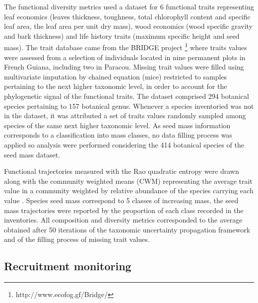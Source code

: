 \documentclass[fleqn,10pt]{ArtEcoFoG} %
\begin{document}
The functional diversity metrics used a dataset for 6 functional traits
representing leaf economics (leaves thickness, toughness, total
chlorophyll content and specific leaf area, the leaf area per unit dry
mass), wood economics (wood specific gravity and bark thickness) and
life history traits (maximum specific height and seed mass). The trait
database came from the BRIDGE project \footnote{http://www.ecofog.gf/Bridge/}
where traits values were assessed from a selection of individuals
located in nine permanent plots in French Guiana, including two in
Paracou. Missing trait values were filled using multivariate imputation
by chained equation (mice) restricted to samples pertaining to the next
higher taxonomic level, in order to account for the phylogenetic signal
of the functional traits. The dataset comprised 294 botanical species
pertaining to 157 botanical genus. Whenever a species inventoried was
not in the dataset, it was attributed a set of traits values randomly
sampled among species of the same next higher taxonomic level. As seed
mass information corresponds to a classification into mass classes, no
data filling process was applied so analysis were performed considering
the 414 botanical species of the seed mass dataset.

Functional trajectories measured with the Rao quadratic entropy were
drawn along with the community weighted means (CWM) representing the
average trait value in a community weighted by relative abundance of the
species carrying each value \citep{Diaz2007, Garnier2004}. Species seed
mass correspond to 5 classes of increasing mass, the seed mass
trajectories were reported by the proportion of each class recorded in
the inventories. All composition and diversity metrics corresponded to
the average obtained after 50 iterations of the taxonomic uncertainty
propagation framework and of the filling process of missing trait
values.

\subsection{Recruitment monitoring}\label{recruitment-monitoring}
\end{document}
